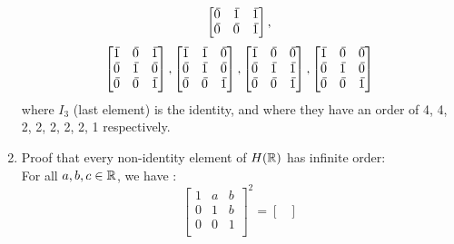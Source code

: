 \documentclass[12pt]{article}
\begin{document}
\begin{enumerate}[label=\textbf{\alph*.}]
\[\begin{bmatrix}
                \,\overline{\!{0}} & \,\overline{\!{1}} & \,\overline{\!{1}} \\
                \,\overline{\!{0}} & \,\overline{\!{0}} & \,\overline{\!{1}} \\
            \end{bmatrix}, \]
            \[ \begin{bmatrix}
                \olsi{1} & \olsi{0} & \olsi{1} \\
                \olsi{0} & \olsi{1} & \olsi{0} \\
                \olsi{0} & \olsi{0} & \olsi{1} \\
            \end{bmatrix},
            \begin{bmatrix}
                \olsi{1} & \olsi{1} & \olsi{0} \\
                \olsi{0} & \olsi{1} & \olsi{0} \\
                \olsi{0} & \olsi{0} & \olsi{1} \\
            \end{bmatrix},
            \begin{bmatrix}
                \olsi{1} & \olsi{0} & \olsi{0} \\
                \olsi{0} & \olsi{1} & \olsi{1} \\
                \olsi{0} & \olsi{0} & \olsi{1} \\
            \end{bmatrix},
            \begin{bmatrix}
                \olsi{1} & \olsi{0} & \olsi{0} \\
                \olsi{0} & \olsi{1} & \olsi{0} \\
                \olsi{0} & \olsi{0} & \olsi{1} \\
            \end{bmatrix} \]
            where $I_3$ (last element) is the identity, and where they
            have an order of 4, 4, 2, 2, 2, 2, 2, 1 respectively.
        \item
            Proof that every non-identity element of $H(\mathbb{R})$ has infinite
            order: \\
            For all $a, b, c \in \mathbb{R}$, we have :
            \[ \begin{bmatrix}
                1 & a & b \\
                0 & 1 & b \\
                0 & 0 & 1 \\
            \end{bmatrix}^2
            = \begin{bmatrix}

\end{bmatrix}\]
\end{enumerate}
\end{document}
